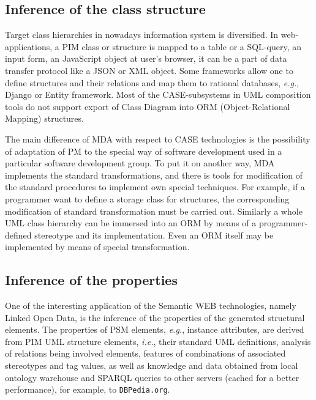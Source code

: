 \documentclass[runningheads]{llncs}
\begin{document}
\subsection{Inference of the class structure}
\label{sec:infstru}

Target class hierarchies in nowadays information system is diversified.  In web-applications, a PIM class or structure is mapped to a table or a SQL-query, an input form, an JavaScript object at user's browser, it can be a part of data transfer protocol like a JSON or XML object.  Some frameworks allow one to define structures and their relations and map them to rational databases, \emph{e.g.}, Django \cite{stratego} or Entity framework.  Most of the CASE-subsystems in UML composition tools do not support export of Class Diagram into ORM (Object-Relational Mapping) structures.

The main difference of MDA with respect to CASE technologies is the possibility of adaptation of PM to the special way of software development used in a particular software development group.  To put it on another way, MDA implements the standard transformations, and there is tools for modification of the standard procedures to implement own special techniques.  For example, if a programmer want to define a storage class for structures, the corresponding modification of standard transformation must be carried out.  Similarly a whole UML class hierarchy can be immersed into an ORM by means of a programmer-defined stereotype and its implementation.  Even an ORM itself may be implemented by means of special transformation.

\subsection{Inference of the properties}
\label{sec:infprop}

One of the interesting application of the Semantic WEB technologies, namely Linked Open Data, is the inference of the properties of the generated structural elements.  The properties of PSM elements, \emph{e.g.}, instance attributes, are derived from PIM UML structure elements, \emph{i.e.}, their standard UML definitions, analysis of relations being involved elements, features of combinations of associated stereotypes and tag values, as well as knowledge and data obtained from local ontology warehouse and SPARQL queries to other servers (cached for a better performance), for example, to \texttt{DBPedia.org}.
\end{document}
